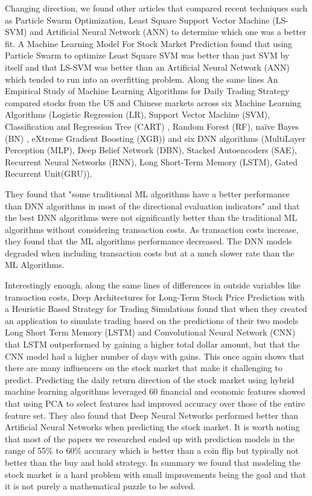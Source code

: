\documentclass[conference]{IEEEtran}
\begin{document}
Changing direction, we found other articles that compared recent techniques such as Particle Swarm Optimization, Least Square Support Vector Machine (LS-SVM) and Artificial Neural Network (ANN) to determine which one was a better fit.  A Machine Learning Model For Stock Market Prediction \cite{MLModelPrediction} found that using Particle Swarm to optimize Least Square SVM was better than just SVM by itself and that LS-SVM was better than an Artificial Neural Network (ANN) which tended to run into an overfitting problem. Along the same lines An Empirical Study of Machine Learning Algorithms for Daily Trading Strategy \cite{EmpiricalStudy} compared stocks from the US and Chinese markets across six Machine Learning Algorithms (Logistic Regression (LR), Support Vector Machine (SVM), Classification and Regression Tree (CART) , Random Forest (RF), naïve Bayes (BN) , eXtreme Gradient Boosting (XGB)) and six DNN algorithms (MultiLayer Perception (MLP), Deep Belief Network (DBN), Stacked Autoencoders (SAE), Recurrent Neural Networks (RNN), Long Short-Term Memory (LSTM), Gated Recurrent Unit(GRU)). 

They found that "some traditional ML algorithms have a better performance than DNN algorithms in most of the directional evaluation indicators" and that the best DNN algorithms were not significantly better than the traditional ML algorithms without considering transaction costs.  As transaction costs increase, they found that the ML algorithms performance decreased.  The DNN models degraded when including transaction costs but at a much slower rate than the ML Algorithms.

Interestingly enough, along the same lines of differences in outside variables like transaction costs, Deep Architectures for Long-Term Stock Price Prediction with a Heuristic Based Strategy for Trading Simulations \cite{LongTermPricePrediction} found that when they created an application to simulate trading based on the predictions of their two models Long Short Term Memory (LSTM) and Convolutional Neural Network (CNN) that LSTM outperformed by gaining a higher total dollar amount, but that the CNN model had a higher number of days with gains.  This once again shows that there are many influencers on the stock market that make it challenging to predict.
Predicting the daily return direction of the stock market using hybrid machine learning algorithms \cite {DailyReturnDirection} leveraged 60 financial and economic features showed that using PCA to select features had improved accuracy over those of the entire feature set.  They also found that Deep Neural Networks performed better than Artificial Neural Networks when predicting the stock market.  It is worth noting that most of the papers we researched ended up with prediction models in the range of 55\% to 60\% accuracy which is better than a coin flip but typically not better than the buy and hold strategy.  In summary we found that modeling the stock market is a hard problem with small improvements being the goal and that it is not purely a mathematical puzzle to be solved.
\end{document}
